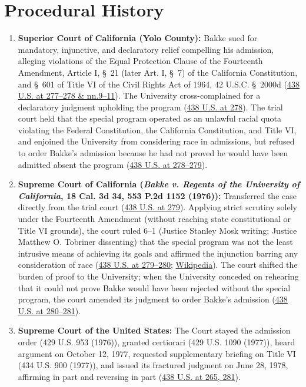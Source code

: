 \documentclass[12pt]{article}
\begin{document}
\section{Procedural History}
\begin{enumerate}
\item \textbf{Superior Court of California (Yolo County):} Bakke sued for mandatory, injunctive, and declaratory relief compelling his admission, alleging violations of the Equal Protection Clause of the Fourteenth Amendment, Article I, \S~21 (later Art. I, \S~7) of the California Constitution, and \S~601 of Title VI of the Civil Rights Act of 1964, 42 U.S.C. \S~2000d (\href{https://supreme.justia.com/cases/federal/us/438/265/}{438 U.S. at 277--278 \& nn.9--11}). The University cross-complained for a declaratory judgment upholding the program (\href{https://supreme.justia.com/cases/federal/us/438/265/}{438 U.S. at 278}). The trial court held that the special program operated as an unlawful racial quota violating the Federal Constitution, the California Constitution, and Title VI, and enjoined the University from considering race in admissions, but refused to order Bakke's admission because he had not proved he would have been admitted absent the program (\href{https://supreme.justia.com/cases/federal/us/438/265/}{438 U.S. at 278--279}).
\item \textbf{Supreme Court of California (\textit{Bakke v. Regents of the University of California}, 18 Cal. 3d 34, 553 P.2d 1152 (1976)):} Transferred the case directly from the trial court (\href{https://supreme.justia.com/cases/federal/us/438/265/}{438 U.S. at 279}). Applying strict scrutiny solely under the Fourteenth Amendment (without reaching state constitutional or Title VI grounds), the court ruled 6--1 (Justice Stanley Mosk writing; Justice Matthew O. Tobriner dissenting) that the special program was not the least intrusive means of achieving its goals and affirmed the injunction barring any consideration of race (\href{https://supreme.justia.com/cases/federal/us/438/265/}{438 U.S. at 279--280}; \href{https://en.wikipedia.org/wiki/Regents_of_the_University_of_California_v._Bakke}{Wikipedia}). The court shifted the burden of proof to the University; when the University conceded on rehearing that it could not prove Bakke would have been rejected without the special program, the court amended its judgment to order Bakke's admission (\href{https://supreme.justia.com/cases/federal/us/438/265/}{438 U.S. at 280--281}).
\item \textbf{Supreme Court of the United States:} The Court stayed the admission order (429 U.S. 953 (1976)), granted certiorari (429 U.S. 1090 (1977)), heard argument on October 12, 1977, requested supplementary briefing on Title VI (434 U.S. 900 (1977)), and issued its fractured judgment on June 28, 1978, affirming in part and reversing in part (\href{https://supreme.justia.com/cases/federal/us/438/265/}{438 U.S. at 265, 281}).
\end{enumerate}
\end{document}
